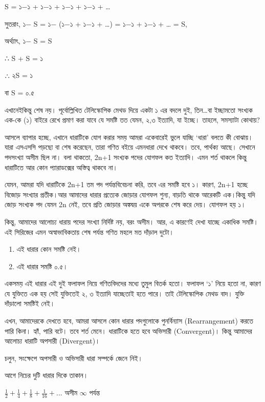 \documentclass[
]{book}
\providecommand{\tightlist}{%
  \setlength{\itemsep}{0pt}\setlength{\parskip}{0pt}}
\begin{document}
S = ১−১ + ১−১ + ১−১ + ১−১ + \ldots{}

সুতরাং, ১− S = ১− (১−১ + ১−১ + \ldots) = ১−১ + ১−১ + \ldots{} = S,

অর্থ্যাৎ, ১− S = S

∴ S + S = ১

∴ ২S = ১

বা S = ০.৫

এখানেইকিন্তু শেষ নয়। পূর্বোল্লিখিত টেলিস্কোপিক মেথড দিয়ে একটা ১ এর বদলে দুই, তিন\ldots বা ইচ্ছামতো সংখ্যক এক-কে (১) বাইরে রেখে প্রমাণ করা যাবে যে সমষ্টি তত যেমন, ২,৩ ইত্যাদি, যা ইচ্ছে। তাহলে, সমস্যাটা কোথায়?

আসলে ব্যাপার হচ্ছে, এখানে ধারাটিকে যোগ করার সময় আমরা একেবারেই ভুলে যাচ্ছি `ধারা' বলতে কী বোঝায়। যারা এসএসসি পড়ছো বা শেষ করেছেন, তারা গণিত বইয়ে এমনধারা দেখে থাকবে। তবে, পার্থক্য আছে। সেখানে পদসংখ্যা অসীম ছিল না। বলা থাকতো, 2n+1 সংখ্যক পদের যোগফল কত ইত্যাদি। এমন শর্ত থাকলে কিন্তু ধারাটিতে আর কোন প্যারাডক্সের অস্তিত্ব থাকবে না।

যেমন, আমরা যদি ধারাটিকে 2n+1 তম পদ পর্যন্তবিবেচনা করি, তবে এর সমষ্টি হবে ১। কারণ, 2n+1 হচ্ছে বিজোড় সংখ্যার প্রতীক।আর আমাদের ধারার প্রত্যেক জোড়ার যোগফল শুন্য, বাড়তি থাকে আরেকটি এক।কিন্তু যদি জোড় সংখ্যক পদ যেমন 2n নেই, তবে প্রতি জোড়ার অঙ্কদ্বয় একে অপরকে শেষ করে দেয়। যোগফল হয় ১।

কিন্তু, আমাদের আলোচ্য ধারায় পদের সংখ্যা নির্দিষ্ট নয়, বরং অসীম। আর, এ কারণেই দেখা যাচ্ছে একাধিক সমষ্টি।
এই সিরিজের এমন অস্বাভাবিকতায় শেষ পর্যন্ত গণিত মহলে মত দাঁড়াল দুটো।

\begin{enumerate}
\def\labelenumi{\arabic{enumi}.}
\tightlist
\item
  এই ধারার কোন সমষ্টি নেই।
\item
  এই ধারার সমষ্টি ০.৫।
\end{enumerate}

একসময় এই ধারার এই দুই ফলাফল নিয়ে গণিতবিদদের মধ্যে তুমুল বিতর্ক হতো। ফলাফল `১' নিয়ে হতো না, কারণ যে যুক্তিতে এক হয় সেই যুক্তিতেই ২, ৩ ইত্যাদি যাচ্ছেতাই হতে পারে। তাই টেলিস্কোপিক মেথড বাদ। যুক্তি দাঁড়ালো সমষ্টিই নেই।

এখন, আমাদেরকে দেখতে হবে, আমরা আসলে কোন ধারার পদগুলোকে পুনর্বিন্যাস (Rearrangement) করতে পারি কিনা। হ্যাঁ, পারি বটে। তবে শর্ত মেনে। ধারাটিকে হতে হবে অভিসারী (Convergent)। কিন্তু আমাদের আলোচ্য ধারাটি অপসারী (Divergent)।

চলুন, সংক্ষেপে অপসারী ও অভিসারী ধারা সম্পর্কে জেনে নিই।

আগে নিচের দুটি ধারার দিকে তাকান।

\(\frac 1 2 + \frac 1 4 + \frac 1 8 + \frac 1 {16} + ...\) অসীম \(\infty\) পর্যন্ত
\end{document}
